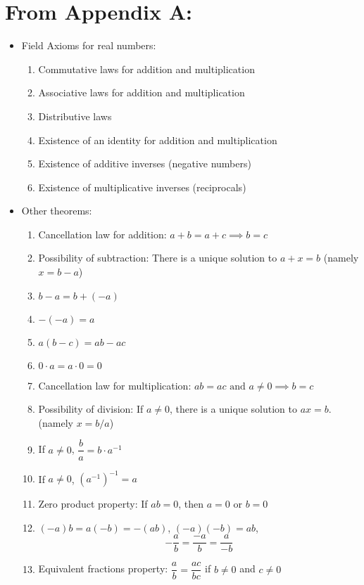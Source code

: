 \documentclass[11pt]{article}
\begin{document}
\section*{From Appendix A:}
\begin{itemize}
    \item Field Axioms for real numbers:
    \begin{enumerate}[label=F\arabic*]
        \item Commutative laws for addition and multiplication
        \item Associative laws for addition and multiplication
        \item Distributive laws
        \item Existence of an identity for addition and multiplication
        \item Existence of additive inverses (negative numbers)
        \item Existence of multiplicative inverses (reciprocals)
    \end{enumerate}
    \item Other theorems:
    \begin{enumerate}[label=T\arabic*]
        \item Cancellation law for addition: $a + b = a + c \implies b = c$
        \item Possibility of subtraction: There is a unique solution to $a + x = b$ (namely $x = b - a$)
        \item $b - a = b + (-a)$
        \item $-(-a) = a$
        \item $a(b - c) = ab - ac$
        \item $0\cdot a = a\cdot 0 = 0$
        \item Cancellation law for multiplication: $ab = ac \text{ and } a \neq 0 \implies b = c$
        \item Possibility of division: If $a \neq 0$, there is a unique solution to $ax = b$. (namely $x = b/a$)
        \item If $a \neq 0$, $\dfrac{b}{a} = b \cdot a^{-1}$
        \item If $a \neq 0$, $(a^{-1})^{-1} = a$
        \item Zero product property: If $ab = 0$, then $a = 0$ or $b = 0$
        \item $(-a) b = a(-b) = - (ab)$, $(-a)(-b) = ab$, $$-\dfrac{a}{b} = \dfrac{-a}{b} = \dfrac{a}{-b}$$
        \item Equivalent fractions property: $\dfrac{a}{b} = \dfrac{ac}{bc}$ if $b\neq 0$ and $c\neq 0$

\end{enumerate}
\end{itemize}
\end{document}
